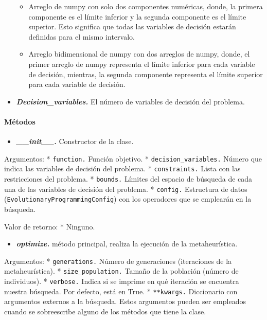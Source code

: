 \documentclass[11pt]{article}
\providecommand{\tightlist}{%
      \setlength{\itemsep}{0pt}\setlength{\parskip}{0pt}}
\begin{document}
\begin{itemize}
  \begin{itemize}
  \tightlist
  \item
    Arreglo de numpy con solo dos componentes numéricas, donde, la
    primera componente es el límite inferior y la segunda componente es
    el límite superior. Esto significa que todas las variables de
    decisión estarán definidas para el mismo intervalo.
  \item
    Arreglo bidimensional de numpy con dos arreglos de numpy, donde, el
    primer arreglo de numpy representa el límite inferior para cada
    variable de decisión, mientras, la segunda componente representa el
    límite superior para cada variable de decisión.
  \end{itemize}
\item
  \emph{\textbf{Decision\_variables.}} El número de variables de
  decisión del problema.
\end{itemize}

\paragraph{Métodos}\label{muxe9todos}

\begin{itemize}
\tightlist
\item
  \emph{\textbf{\_\_init\_\_.}} Constructor de la clase.
\end{itemize}

Argumentos: * \texttt{function.} Función objetivo. *
\texttt{decision\_variables.} Número que indica las variables de
decisión del problema. * \texttt{constraints.} Lista con las
restricciones del problema. * \texttt{bounds.} Límites del espacio de
búsqueda de cada una de las variables de decisión del problema. *
\texttt{config.} Estructura de datos
(\texttt{EvolutionaryProgrammingConfig}) con los operadores que se
emplearán en la búsqueda.

Valor de retorno: * Ninguno.

\begin{itemize}
\tightlist
\item
  \emph{\textbf{optimize.}} método principal, realiza la ejecución de la
  metaheurística.
\end{itemize}

Argumentos: * \texttt{generations.} Número de generaciones (iteraciones
de la metaheurística). * \texttt{size\_population.} Tamaño de la
población (número de individuos). * \texttt{verbose.} Indica si se
imprime en qué iteración se encuentra nuestra búsqueda. Por defecto,
está en True. * \texttt{**kwargs.} Diccionario con argumentos externos a
la búsqueda. Estos argumentos pueden ser empleados cuando se
sobreescribe alguno de los métodos que tiene la clase.
\end{document}
